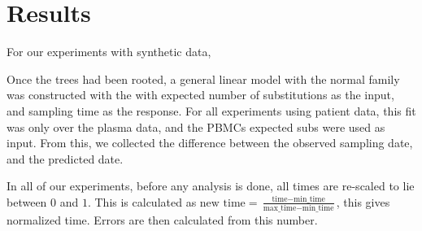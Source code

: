 \section{Results} \label{sec:results}
For our experiments with synthetic data, 


Once the trees had been rooted, a general linear model with the normal family was constructed with the with expected number of substitutions as the input, and sampling time as the response. For all experiments using patient data, this fit was only over the plasma data, and the PBMCs expected subs were used as input. From this, we collected the difference between the observed sampling date, and the predicted date. 

In all of our experiments, before any analysis is done, all times are re-scaled to lie between $0$ and $1$. This is calculated as $ \text{new time} = \frac{\text{time} - \text{min_time}}{\text{max_time} - \text{min_time}}$, this gives normalized time. Errors are then calculated from this number.

